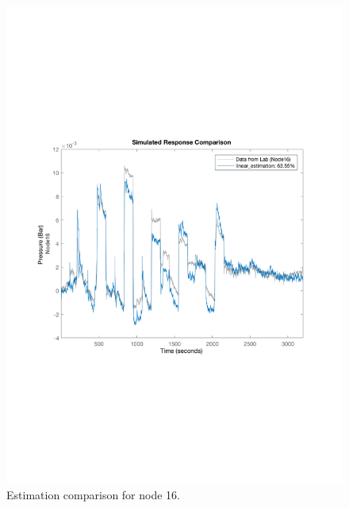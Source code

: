 \begin{figure}[H]
\begin{minipage}[b]{0.45\textwidth}
    \includegraphics[width=\textwidth]{report/pictures/Node16_estimation_1.pdf}
    \caption{Estimation comparison for node 16.}
  \end{minipage}
\end{figure}

